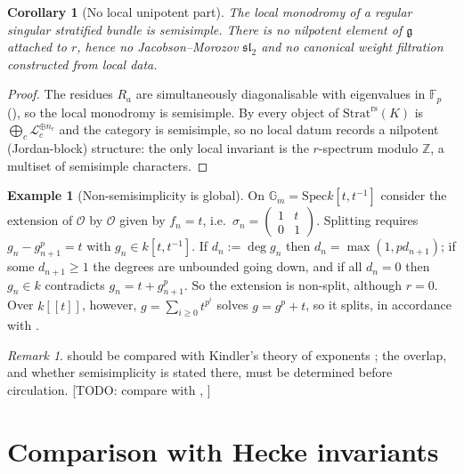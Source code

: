 \documentclass[11pt,reqno]{amsart}
\newcommand{\TODO}[1]{{\color{red}\textsf{[TODO: #1]}}}
\newcommand{\Fp}{\mathbb{F}_p}
\newcommand{\ZZ}{\mathbb{Z}}
\newcommand{\GG}{\mathbb{G}}
\newcommand{\cO}{\mathcal{O}}
\newcommand{\cL}{\mathcal{L}}
\newcommand{\fg}{\mathfrak{g}}
\newcommand{\Strat}{\mathrm{Strat}}
\newcommand{\rs}{\mathrm{rs}}
\newcommand{\Spec}{\mathrm{Spec}}
\theoremstyle{plain}
\newtheorem{corollary}[theorem]{Corollary}
\theoremstyle{definition}
\newtheorem{example}[theorem]{Example}
\theoremstyle{remark}
\newtheorem{remark}[theorem]{Remark}
\numberwithin{equation}{section}
\begin{document}
\begin{corollary}[No local unipotent part]\label{cor:nounipotent}
The local monodromy of a regular singular stratified bundle is semisimple.
There is no nilpotent element of $\fg$ attached to $r$, hence no
Jacobson--Morozov $\mathfrak{sl}_2$ and no canonical weight filtration
constructed from local data.
\end{corollary}
\begin{proof}
The residues $R_a$ are simultaneously diagonalisable with eigenvalues in
$\Fp$ (), so the local monodromy is semisimple.  By
 every object of $\Strat^{\rs}(K)$ is
$\bigoplus_c\cL_c^{\oplus n_c}$ and the category is semisimple, so no
local datum records a nilpotent (Jordan-block) structure: the only local
invariant is the $r$-spectrum modulo $\ZZ$, a multiset of semisimple
characters.
\end{proof}

\begin{example}[Non-semisimplicity is global]\label{ex:globalext}
On $\GG_m=\Spec k[t,t^{-1}]$ consider the extension of $\cO$ by $\cO$
given by $f_n=t$, i.e.\ $\sigma_n=\begin{pmatrix}1&t\\0&1\end{pmatrix}$.
Splitting requires $g_n-g_{n+1}^p=t$ with $g_n\in k[t,t^{-1}]$.  If
$d_n:=\deg g_n$ then $d_n=\max(1,pd_{n+1})$; if some $d_{n+1}\ge1$ the
degrees are unbounded going down, and if all $d_n=0$ then $g_n\in k$
contradicts $g_n=t+g_{n+1}^p$.  So the extension is non-split, although
$r=0$.  Over $k[[t]]$, however, $g=\sum_{i\ge0}t^{p^i}$ solves
$g=g^p+t$, so it splits, in accordance with
.
\end{example}

\begin{remark}
 should be compared with Kindler's theory of
exponents \cite{Kindler}; the overlap, and whether semisimplicity is
stated there, must be determined before circulation.
\TODO{compare with \cite{Kindler}, \cite{EsnaultKindler}}
\end{remark}

\section{Comparison with Hecke invariants}\label{sec:comparison}
\end{document}
